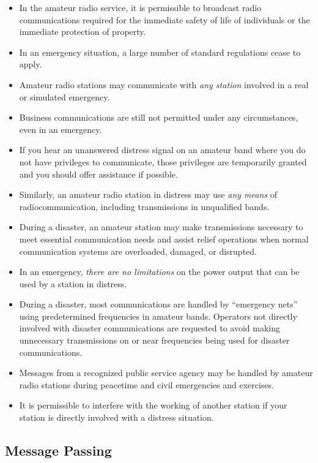 \documentclass[letterpaper,12pt]{scrartcl}
\begin{document}
\begin{itemize}
\item In the amateur radio service, it is permissible to broadcast radio communications required for the immediate safety of life of individuals
or the immediate protection of property.
\item In an emergency situation, a large number of standard regulations cease to apply.
\item Amateur radio stations may communicate with \textit{any station} involved in a real or simulated emergency.
\item Business communications are still not permitted under any circumstances, even in an emergency.
\item If you hear an unanswered distress signal on an amateur band where you do not have privileges to communicate,
those privileges are temporarily granted and you should offer assistance if possible.
\item Similarly, an amateur radio station in distress may use \textit{any means} of radiocommunication, including transmissions in unqualified bands.
\item During a disaster, an amateur station may make transmissions necessary to meet essential communication needs and assist relief operations when
normal communication systems are overloaded, damaged, or disrupted.
\item In an emergency, \textit{there are no limitations} on the power output that can be used by a station in distress.
\item During a disaster, most communications are handled by ``emergency nets'' using predetermined frequencies in amateur bands.
Operators not directly involved with disaster communications are requested to avoid making unnecessary transmissions on or near
frequencies being used for disaster communications.
\item Messages from a recognized public service agency may be handled by amateur radio stations during peacetime and civil emergencies and exercises.
\item It is permissible to interfere with the working of another station if your station is directly involved with a distress situation.
\end{itemize}

\subsection{Message Passing}
\end{document}
